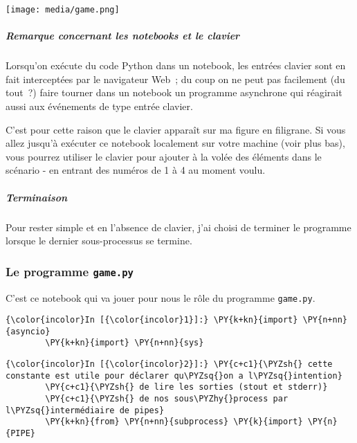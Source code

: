     \texttt{[image: media/game.png]}

    \hypertarget{remarque-concernant-les-notebooks-et-le-clavier}{%
\subparagraph{Remarque concernant les notebooks et le
clavier}\label{remarque-concernant-les-notebooks-et-le-clavier}}

    Lorsqu'on exécute du code Python dans un notebook, les entrées clavier
sont en fait interceptées par le navigateur Web~; du coup on ne peut pas
facilement (du tout~?) faire tourner dans un notebook un programme
asynchrone qui réagirait aussi aux événements de type entrée clavier.

C'est pour cette raison que le clavier apparaît sur ma figure en
filigrane. Si vous allez jusqu'à exécuter ce notebook localement sur
votre machine (voir plus bas), vous pourrez utiliser le clavier pour
ajouter à la volée des éléments dans le scénario - en entrant des
numéros de 1 à 4 au moment voulu.

    \hypertarget{terminaison}{%
\subparagraph{Terminaison}\label{terminaison}}

    Pour rester simple et en l'absence de clavier, j'ai choisi de terminer
le programme lorsque le dernier sous-processus se termine.

    \hypertarget{le-programme-game.py}{%
\subsubsection{\texorpdfstring{Le programme
\texttt{game.py}}{Le programme game.py}}\label{le-programme-game.py}}

    C'est ce notebook qui va jouer pour nous le rôle du programme
\texttt{game.py}.

    \begin{Verbatim}[commandchars=\\\{\}]
{\color{incolor}In [{\color{incolor}1}]:} \PY{k+kn}{import} \PY{n+nn}{asyncio}
        \PY{k+kn}{import} \PY{n+nn}{sys}
\end{Verbatim}


    \begin{Verbatim}[commandchars=\\\{\}]
{\color{incolor}In [{\color{incolor}2}]:} \PY{c+c1}{\PYZsh{} cette constante est utile pour déclarer qu\PYZsq{}on a l\PYZsq{}intention}
        \PY{c+c1}{\PYZsh{} de lire les sorties (stout et stderr)}
        \PY{c+c1}{\PYZsh{} de nos sous\PYZhy{}process par l\PYZsq{}intermédiaire de pipes}
        \PY{k+kn}{from} \PY{n+nn}{subprocess} \PY{k}{import} \PY{n}{PIPE}
\end{Verbatim}


